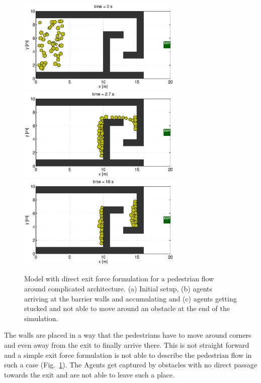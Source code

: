 \documentclass[11pt]{article}
\begin{document}
\begin{figure}
	\begin{center}
	\includegraphics[width=0.7\textwidth]
	{figures/Model2_direct_1_000000.eps}
	\qquad
	\includegraphics[width=0.7\textwidth]
	{figures/Model2_direct_1_000270.eps}
	\qquad
	\includegraphics[width=0.7\textwidth]
	{figures/Model2_direct_1_001800.eps}
	\caption{Model with direct exit force formulation for a pedestrian flow around complicated architecture. (a) Initial setup, (b) agents arriving at the barrier walls and accumulating and (c) agents getting stucked and not able to move around an obstacle at the end of the simulation.}
	\label{fig:simple3}
	\end{center}
\end{figure}

The walls are placed in a way that the pedestrians have to move around corners and even away from the exit to finally arrive there. This is not straight forward and a simple exit force formulation is not able to describe the pedestrian flow in such a case (Fig.~\ref{fig:simple3}). The Agents get captured by obstacles with no direct passage towards the exit and are not able to leave such a place. 
\end{document}
